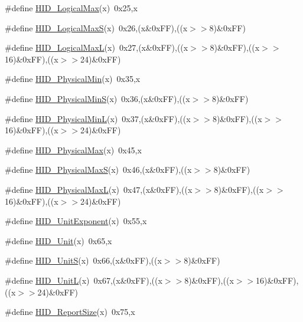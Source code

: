 \begin{DoxyCompactItemize}
\item 
\#define \hyperlink{group__USBD__HID_ga3e590f9d3c4c2743d8e4730e923d719a}{H\-I\-D\-\_\-\-Logical\-Max}(x)~0x25,x
\item 
\#define \hyperlink{group__USBD__HID_gaf40c4bcecce7307ec6d2e4e03ec40c48}{H\-I\-D\-\_\-\-Logical\-Max\-S}(x)~0x26,(x\&0x\-F\-F),((x$>$$>$8)\&0x\-F\-F)
\item 
\#define \hyperlink{group__USBD__HID_ga9311c4ffc3e158cd913dab88b1f6009a}{H\-I\-D\-\_\-\-Logical\-Max\-L}(x)~0x27,(x\&0x\-F\-F),((x$>$$>$8)\&0x\-F\-F),((x$>$$>$16)\&0x\-F\-F),((x$>$$>$24)\&0x\-F\-F)
\item 
\#define \hyperlink{group__USBD__HID_gac57d2dd4d78cb9ec43c94e8782e2a51f}{H\-I\-D\-\_\-\-Physical\-Min}(x)~0x35,x
\item 
\#define \hyperlink{group__USBD__HID_ga803f811ce4caa8af4f6ae0785bbe3ad3}{H\-I\-D\-\_\-\-Physical\-Min\-S}(x)~0x36,(x\&0x\-F\-F),((x$>$$>$8)\&0x\-F\-F)
\item 
\#define \hyperlink{group__USBD__HID_gab0c40033d00ac4948854eb692c5888dc}{H\-I\-D\-\_\-\-Physical\-Min\-L}(x)~0x37,(x\&0x\-F\-F),((x$>$$>$8)\&0x\-F\-F),((x$>$$>$16)\&0x\-F\-F),((x$>$$>$24)\&0x\-F\-F)
\item 
\#define \hyperlink{group__USBD__HID_gaa7a1a745779d9b52f6c3ea68461bdfc9}{H\-I\-D\-\_\-\-Physical\-Max}(x)~0x45,x
\item 
\#define \hyperlink{group__USBD__HID_ga1b4ed04cb59b9e96dfc43dcf629faa99}{H\-I\-D\-\_\-\-Physical\-Max\-S}(x)~0x46,(x\&0x\-F\-F),((x$>$$>$8)\&0x\-F\-F)
\item 
\#define \hyperlink{group__USBD__HID_ga747ac0b71d5b2d671cce828606c5bbcd}{H\-I\-D\-\_\-\-Physical\-Max\-L}(x)~0x47,(x\&0x\-F\-F),((x$>$$>$8)\&0x\-F\-F),((x$>$$>$16)\&0x\-F\-F),((x$>$$>$24)\&0x\-F\-F)
\item 
\#define \hyperlink{group__USBD__HID_ga207ebde0995e36de0e3bd0beb4136b4c}{H\-I\-D\-\_\-\-Unit\-Exponent}(x)~0x55,x
\item 
\#define \hyperlink{group__USBD__HID_ga383c37fd89d9da8c876e01f287627d08}{H\-I\-D\-\_\-\-Unit}(x)~0x65,x
\item 
\#define \hyperlink{group__USBD__HID_ga1838f450a9fec9de42f8ddf9a98c9c9d}{H\-I\-D\-\_\-\-Unit\-S}(x)~0x66,(x\&0x\-F\-F),((x$>$$>$8)\&0x\-F\-F)
\item 
\#define \hyperlink{group__USBD__HID_ga712afcd729f47603f6b9a34223312a4b}{H\-I\-D\-\_\-\-Unit\-L}(x)~0x67,(x\&0x\-F\-F),((x$>$$>$8)\&0x\-F\-F),((x$>$$>$16)\&0x\-F\-F),((x$>$$>$24)\&0x\-F\-F)
\item 
\#define \hyperlink{group__USBD__HID_ga4ad64076c0bddb6e9427847a7d71e3b8}{H\-I\-D\-\_\-\-Report\-Size}(x)~0x75,x

\end{DoxyCompactItemize}

